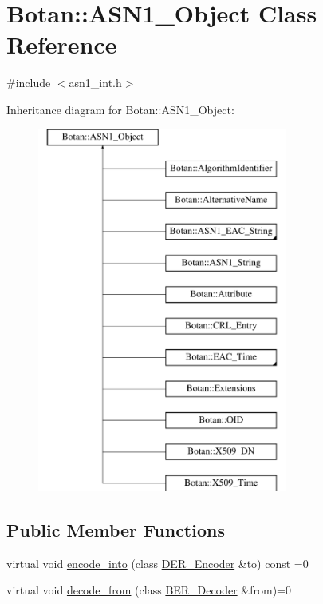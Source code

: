\hypertarget{classBotan_1_1ASN1__Object}{\section{Botan\-:\-:A\-S\-N1\-\_\-\-Object Class Reference}
\label{classBotan_1_1ASN1__Object}
}


{\ttfamily \#include $<$asn1\-\_\-int.\-h$>$}

Inheritance diagram for Botan\-:\-:A\-S\-N1\-\_\-\-Object\-:\begin{figure}[H]
\begin{center}
\leavevmode
\includegraphics[height=12.000000cm]{classBotan_1_1ASN1__Object}
\end{center}
\end{figure}
\subsection*{Public Member Functions}
\begin{DoxyCompactItemize}
\item 
virtual void \hyperlink{classBotan_1_1ASN1__Object_a05db1180efe5c3acc30266d0032823ea}{encode\-\_\-into} (class \hyperlink{classBotan_1_1DER__Encoder}{D\-E\-R\-\_\-\-Encoder} \&to) const =0
\item 
virtual void \hyperlink{classBotan_1_1ASN1__Object_a9623f0d0f09c3ab4fb3ff44f1d42290f}{decode\-\_\-from} (class \hyperlink{classBotan_1_1BER__Decoder}{B\-E\-R\-\_\-\-Decoder} \&from)=0
\end{DoxyCompactItemize}


